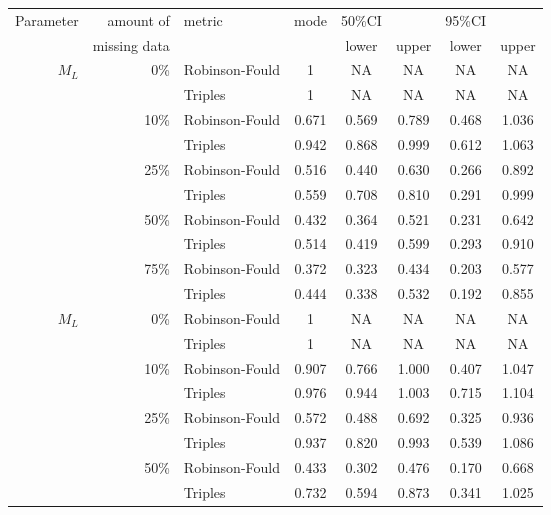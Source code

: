 \begin{tabular}{rrlccccc}
    \hline
    Parameter & amount of    & metric & mode & 50\%CI &       & 95\%CI &       \\
              & missing data &        &      & lower  & upper & lower  & upper \\
    \hline
    $M_L$     & 0\%          & Robinson-Fould & 1 & NA  & NA & NA  & NA \\
              &              & Triples        & 1 & NA  & NA & NA  & NA \\
              & 10\%         & Robinson-Fould & 0.671 & 0.569  & 0.789 & 0.468  & 1.036 \\ %
              &              & Triples        & 0.942 & 0.868  & 0.999 & 0.612  & 1.063 \\
              & 25\%         & Robinson-Fould & 0.516 & 0.440  & 0.630 & 0.266  & 0.892 \\
              &              & Triples        & 0.559 & 0.708  & 0.810 & 0.291  & 0.999 \\
              & 50\%         & Robinson-Fould & 0.432 & 0.364  & 0.521 & 0.231  & 0.642 \\
              &              & Triples        & 0.514 & 0.419  & 0.599 & 0.293  & 0.910 \\
              & 75\%         & Robinson-Fould & 0.372 & 0.323  & 0.434 & 0.203  & 0.577 \\
              &              & Triples        & 0.444 & 0.338  & 0.532 & 0.192  & 0.855 \\
    $M_L$     & 0\%          & Robinson-Fould & 1 & NA  & NA & NA  & NA \\
              &              & Triples        & 1 & NA  & NA & NA  & NA \\
              & 10\%         & Robinson-Fould & 0.907 & 0.766  & 1.000 & 0.407  & 1.047 \\
              &              & Triples        & 0.976 & 0.944  & 1.003 & 0.715  & 1.104 \\
              & 25\%         & Robinson-Fould & 0.572 & 0.488  & 0.692 & 0.325  & 0.936 \\
              &              & Triples        & 0.937 & 0.820  & 0.993 & 0.539  & 1.086 \\
              & 50\%         & Robinson-Fould & 0.433 & 0.302  & 0.476 & 0.170  & 0.668 \\
              &              & Triples        & 0.732 & 0.594  & 0.873 & 0.341  & 1.025 \\

\end{tabular}
